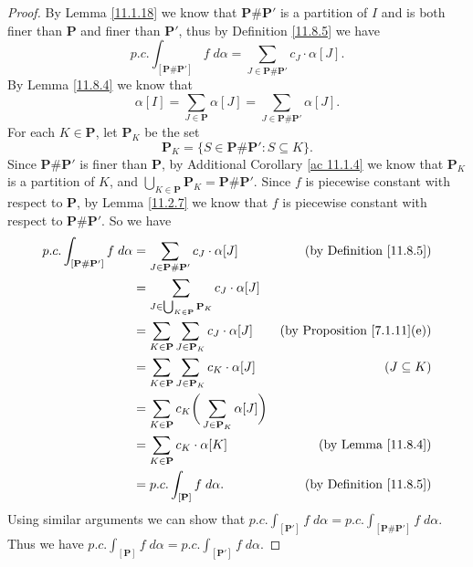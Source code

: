 \begin{proof}
    By Lemma \ref{11.1.18} we know that \(\mathbf{P} \# \mathbf{P}'\) is a partition of \(I\) and is both finer than \(\mathbf{P}\) and finer than \(\mathbf{P}'\), thus by Definition \ref{11.8.5} we have
    \[
        p.c. \int_{[\mathbf{P} \# \mathbf{P}']} f \; d \alpha = \sum_{J \in \mathbf{P} \# \mathbf{P}'} c_J \cdot \alpha[J].
    \]
    By Lemma \ref{11.8.4} we know that
    \[
        \alpha[I] = \sum_{J \in \mathbf{P}} \alpha[J] = \sum_{J \in \mathbf{P} \# \mathbf{P}'} \alpha[J].
    \]
    For each \(K \in \mathbf{P}\), let \(\mathbf{P}_K\) be the set
    \[
        \mathbf{P}_K = \{S \in \mathbf{P} \# \mathbf{P}' : S \subseteq K\}.
    \]
    Since \(\mathbf{P} \# \mathbf{P}'\) is finer than \(\mathbf{P}\), by Additional Corollary \ref{ac 11.1.4} we know that \(\mathbf{P}_K\) is a partition of \(K\), and \(\bigcup_{K \in \mathbf{P}} \mathbf{P}_K = \mathbf{P} \# \mathbf{P}'\).
    Since \(f\) is piecewise constant with respect to \(\mathbf{P}\), by Lemma \ref{11.2.7} we know that \(f\) is piecewise constant with respect to \(\mathbf{P} \# \mathbf{P}'\).
    So we have
    \begin{align*}
        p.c. \int_{[\mathbf{P} \# \mathbf{P}']} f \; d \alpha & = \sum_{J \in \mathbf{P} \# \mathbf{P}'} c_J \cdot \alpha[J]                  & \text{(by Definition \ref{11.8.5})}     \\
                                                              & = \sum_{J \in \bigcup_{K \in \mathbf{P}} \mathbf{P}_K} c_J \cdot \alpha[J]                                              \\
                                                              & = \sum_{K \in \mathbf{P}} \sum_{J \in \mathbf{P}_K} c_J \cdot \alpha[J]       & \text{(by Proposition \ref{7.1.11}(e))} \\
                                                              & = \sum_{K \in \mathbf{P}} \sum_{J \in \mathbf{P}_K} c_K \cdot \alpha[J]       & (J \subseteq K)                         \\
                                                              & = \sum_{K \in \mathbf{P}} c_K \bigg(\sum_{J \in \mathbf{P}_K} \alpha[J]\bigg)                                           \\
                                                              & = \sum_{K \in \mathbf{P}} c_K \cdot \alpha[K]                                 & \text{(by Lemma \ref{11.8.4})}          \\
                                                              & = p.c. \int_{[\mathbf{P}]} f \; d \alpha.                                     & \text{(by Definition \ref{11.8.5})}
    \end{align*}
    Using similar arguments we can show that \(p.c. \int_{[\mathbf{P}']} f \; d \alpha = p.c. \int_{[\mathbf{P} \# \mathbf{P}']} f \; d \alpha\).
    Thus we have \(p.c. \int_{[\mathbf{P}]} f \; d \alpha = p.c. \int_{[\mathbf{P}']} f \; d \alpha\).
\end{proof}

